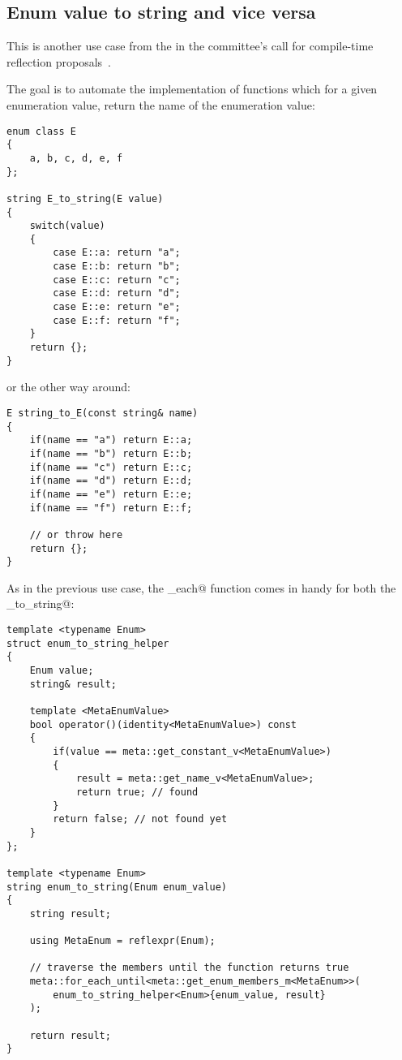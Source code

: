 \subsection{Enum value to string and vice versa}
\label{use-case-enum-to-string}

This is another use case from the  in the committee's
call for compile-time reflection proposals~\cite{ISOCPP-N3814}. 

The goal is to automate the implementation of functions which for a given
enumeration value, return the name of the enumeration value:

\begin{verbatim}
enum class E
{
	a, b, c, d, e, f
};

string E_to_string(E value)
{
	switch(value)
	{
		case E::a: return "a";
		case E::b: return "b";
		case E::c: return "c";
		case E::d: return "d";
		case E::e: return "e";
		case E::f: return "f";
	}
	return {};
}
\end{verbatim}

or the other way around:

\begin{verbatim}
E string_to_E(const string& name)
{
	if(name == "a") return E::a;
	if(name == "b") return E::b;
	if(name == "c") return E::c;
	if(name == "d") return E::d;
	if(name == "e") return E::e;
	if(name == "f") return E::f;

	// or throw here
	return {};
}
\end{verbatim}

As in the previous use case, the \verb@for_each@ function comes in handy
for both the \verb@enum_to_string@:

\begin{verbatim}
template <typename Enum>
struct enum_to_string_helper
{
	Enum value;
	string& result;

	template <MetaEnumValue>
	bool operator()(identity<MetaEnumValue>) const
	{
		if(value == meta::get_constant_v<MetaEnumValue>)
		{
			result = meta::get_name_v<MetaEnumValue>;
			return true; // found
		}
		return false; // not found yet
	}
};

template <typename Enum>
string enum_to_string(Enum enum_value)
{
	string result;

	using MetaEnum = reflexpr(Enum);

	// traverse the members until the function returns true
	meta::for_each_until<meta::get_enum_members_m<MetaEnum>>(
		enum_to_string_helper<Enum>{enum_value, result}
	);

	return result;
}
\end{verbatim}

